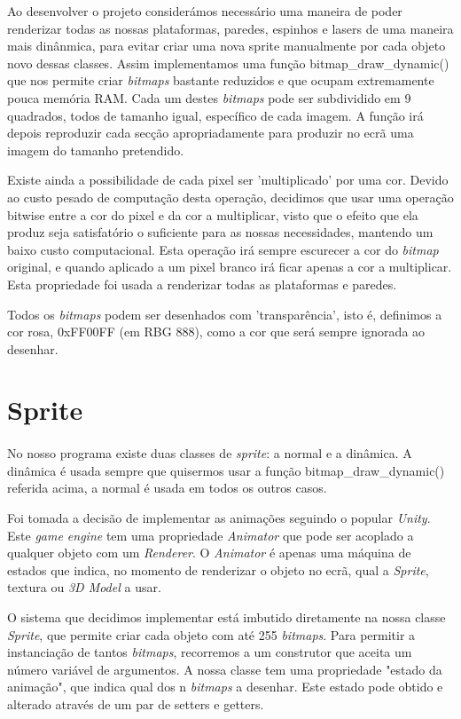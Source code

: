 \documentclass{report}
\begin{document}
Ao desenvolver o projeto considerámos necessário uma maneira de poder renderizar todas as nossas plataformas, paredes, espinhos e lasers de uma maneira mais dinânmica, para evitar criar uma nova sprite manualmente por cada objeto novo dessas classes. Assim implementamos uma função bitmap\_draw\_dynamic() que nos permite criar \textit{bitmaps} bastante reduzidos e que ocupam extremamente pouca memória RAM. Cada um destes \textit{bitmaps} pode ser subdividido em 9 quadrados, todos de tamanho igual, específico de cada imagem. A função irá depois reproduzir cada secção apropriadamente para produzir no ecrã uma imagem do tamanho pretendido.

Existe ainda a possibilidade de cada pixel ser 'multiplicado' por uma cor. Devido ao custo pesado de computação desta operação, decidimos que usar uma operação bitwise entre a cor do pixel e da cor a multiplicar, visto que o efeito que ela produz seja satisfatório o suficiente para as nossas necessidades, mantendo um baixo custo computacional. Esta operação irá sempre escurecer a cor do \textit{bitmap} original, e quando aplicado a um pixel branco irá ficar apenas a cor a multiplicar. Esta propriedade foi usada a renderizar todas as plataformas e paredes. 

Todos os \textit{bitmaps} podem ser desenhados com 'transparência', isto é, definimos a cor rosa, 0xFF00FF (em RBG 888), como a cor que será sempre ignorada ao desenhar.

\section{Sprite}

\paragraph{}
No nosso programa existe duas classes de \textit{sprite}: a normal e a dinâmica. A dinâmica é usada sempre que quisermos usar a função bitmap\_draw\_dynamic() referida acima, a normal é usada em todos os outros casos.

Foi tomada a decisão de implementar as animações seguindo o popular \textit{Unity}. Este \textit{game engine} tem uma propriedade \textit{Animator} que pode ser acoplado a qualquer objeto com um \textit{Renderer}. O \textit{Animator} é apenas uma máquina de estados que indica, no momento de renderizar o objeto no ecrã, qual a \textit{Sprite}, textura ou \textit{3D Model} a usar.

O sistema que decidimos implementar está imbutido diretamente na nossa classe \textit{Sprite}, que permite criar cada objeto com até 255 \textit{bitmaps}. Para permitir a instanciação de tantos \textit{bitmaps}, recorremos a um construtor que aceita um número variável de argumentos. A nossa classe tem uma propriedade "estado da animação", que indica qual dos n \textit{bitmaps} a desenhar. Este estado pode obtido e alterado através de um par de setters e getters.
\end{document}
